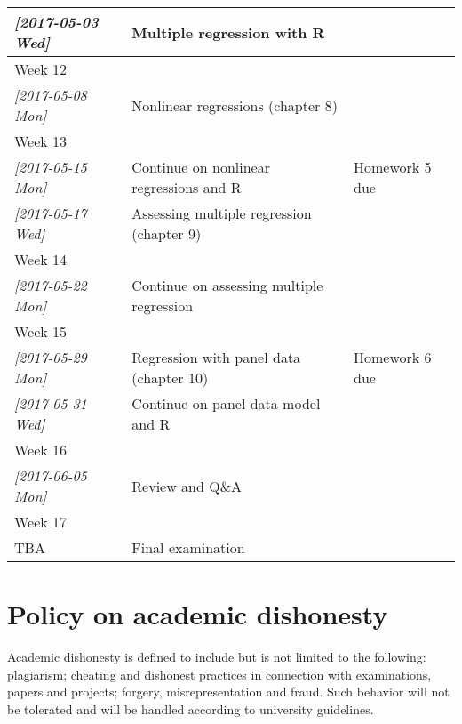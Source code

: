\documentclass[a4paper,11pt]{article}
\begin{document}
{\begin{longtable}{p{2.8cm}p{9cm}p{2.8cm}}
\textit{[2017-05-03 Wed]} & Multiple regression with R & \\
\hline
Week 12 &  & \\
\textit{[2017-05-08 Mon]} & Nonlinear regressions (chapter 8) & \\
\hline
Week 13 &  & \\
\textit{[2017-05-15 Mon]} & Continue on nonlinear regressions and R & Homework 5 due\\
\textit{[2017-05-17 Wed]} & Assessing multiple regression (chapter 9) & \\
\hline
Week 14 &  & \\
\textit{[2017-05-22 Mon]} & Continue on assessing multiple regression & \\
\hline
Week 15 &  & \\
\textit{[2017-05-29 Mon]} & Regression with panel data (chapter 10) & Homework 6 due\\
\textit{[2017-05-31 Wed]} & Continue on panel data model and R & \\
\hline
Week 16 &  & \\
\textit{[2017-06-05 Mon]} & Review and Q\&A & \\
\hline
Week 17 &  & \\
TBA & Final examination & \\
\hline
\end{longtable}
}


\section{Policy on academic dishonesty}
\label{sec:orgf2802fb}

Academic dishonesty is defined to include but is not limited to the
following: plagiarism; cheating and dishonest practices in connection
with examinations, papers and projects; forgery, misrepresentation and
fraud. Such behavior will not be tolerated and will be handled
according to university guidelines.
\end{document}
